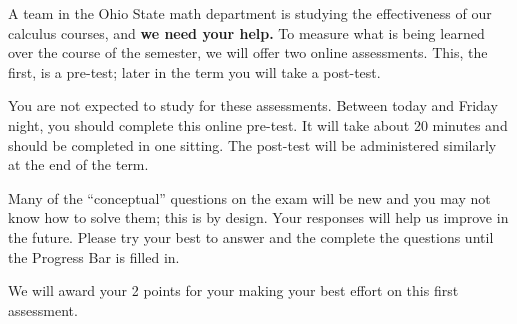 \documentclass{article}
\begin{document}
A team in the Ohio State math department is studying the effectiveness
of our calculus courses, and \textbf{we need your help.}  To measure
what is being learned over the course of the semester, we will offer
two online assessments.  This, the first, is a pre-test; later in the
term you will take a post-test.

You are not expected to study for these assessments.  Between today
and Friday night, you should complete this online pre-test.  It will
take about 20 minutes and should be completed in one sitting.  The
post-test will be administered similarly at the end of the term.

Many of the ``conceptual'' questions on the exam will be new and you
may not know how to solve them; this is by design.  Your responses
will help us improve in the future.  Please try your best to answer
and the complete the questions until the Progress Bar is filled in.

We will award your 2 points for your making your best effort on this
first assessment.
\end{document}
